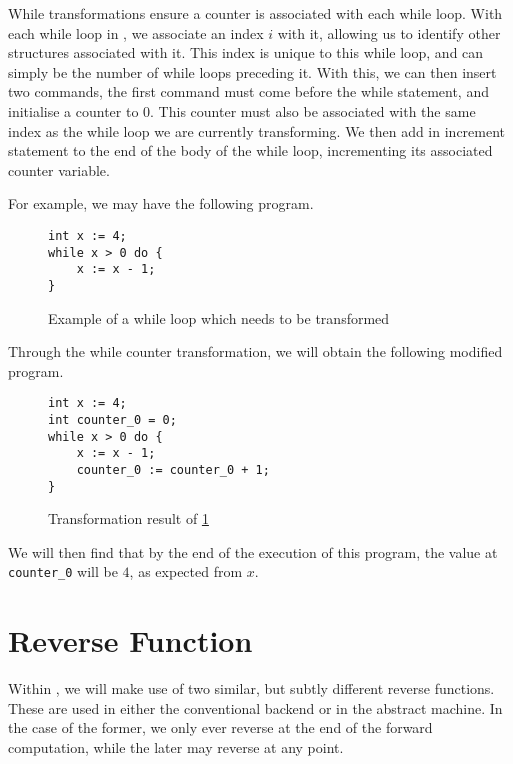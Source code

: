 While transformations ensure a counter is associated with each while loop. With each while loop in \rimplang, we associate an index $i$ with it, allowing us to identify other structures associated with it. This index is unique to this while loop, and can simply be the number of while loops preceding it. With this, we can then insert two commands, the first command must come before the while statement, and initialise a counter to $0$. This counter must also be associated with the same index as the while loop we are currently transforming. We then add in increment statement to the end of the body of the while loop, incrementing its associated counter variable.

For example, we may have the following program.

\begin{figure}[hbt!]
    \centering
    \begin{lstlisting}[label={lst:whileloop}, basicstyle=\small]
int x := 4;
while x > 0 do {
    x := x - 1;
}
    \end{lstlisting}
    \caption{Example of a while loop which needs to be transformed}
    \label{fig:whileloop}
\end{figure}

Through the while counter transformation, we will obtain the following modified program.

\begin{figure}[hbt!]
    \centering
    \begin{lstlisting}[label={lst:whileloopmodified}, basicstyle=\small]
int x := 4;
int counter_0 = 0;
while x > 0 do {
    x := x - 1;
    counter_0 := counter_0 + 1;
}
    \end{lstlisting}
    \caption{Transformation result of \ref{fig:whileloop}}
    \label{fig:whileloopmodified}
\end{figure}

We will then find that by the end of the execution of this program, the value at \lstinline{counter_0} will be $4$, as expected from $x$.

\section{Reverse Function}

Within \rimp, we will make use of two similar, but subtly different reverse functions. These are used in either the conventional backend or in the abstract machine. In the case of the former, we only ever reverse at the end of the forward computation, while the later may reverse at any point.

